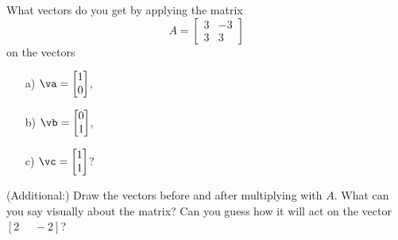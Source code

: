



\begin{problem}
    What vectors do you get by applying the matrix
    \[
    A = \begin{bmatrix}
        3 & -3 \\
        3 & 3
    \end{bmatrix}
    \] 
    on the vectors 
    \begin{enumerate}
        \item[a) ] $\va=\begin{bmatrix}
            1 \\ 0
        \end{bmatrix}$,

          \item[b) ] $\vb=\begin{bmatrix}
            0 \\ 1
        \end{bmatrix}$,

          \item[c) ] $\vc=\begin{bmatrix}
            1 \\ 1
        \end{bmatrix}$?
    \end{enumerate}
    
    (Additional:) Draw the vectors before and after multiplying with $A$. What can you say visually about the matrix? Can you guess how it will act on the vector $[2\,\,\,\,\,\,\,\, -2]$?
    \end{problem}

